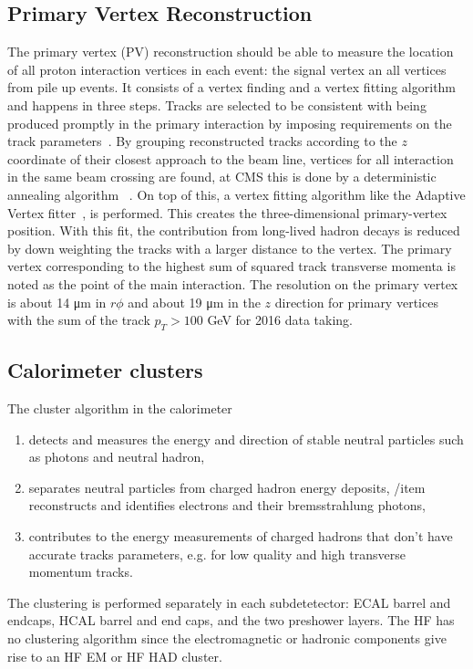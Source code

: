 \subsection{Primary Vertex Reconstruction}
The primary vertex (PV) reconstruction should be able to measure the location of all proton interaction vertices in each event: the signal vertex an all vertices from pile up events. 
It consists of a vertex finding and a vertex fitting algorithm and happens in three steps. Tracks are selected  to be consistent with being produced promptly in the primary interaction by imposing requirements on the track parameters~\cite{Chatrchyan:1704291}. By grouping reconstructed tracks according to the $z$ coordinate of their closest approach to the beam line, vertices for all interaction in the same beam crossing are found, at CMS this is done by a deterministic annealing algorithm~\cite{726788} . On top of this, a vertex fitting algorithm like the Adaptive Vertex fitter~\cite{Waltenberger:1166320}, is performed. This creates the three-dimensional primary-vertex position. With this fit, the contribution from long-lived hadron decays is reduced by down weighting the tracks with a larger distance to the vertex. The primary vertex corresponding to the highest sum of squared track transverse momenta is noted as the point of the main interaction. The resolution on the primary vertex is about 14 \si{ \micro \meter} in $r\phi$ and about 19 \si{ \micro \meter} in the $z$ direction for primary vertices with the sum of the track $p_T > 100$ \si{ \GeV} for 2016 data taking.

\subsection{Calorimeter clusters}
The cluster algorithm in the calorimeter 
\begin{enumerate}
	\item detects and measures the energy and direction of stable neutral particles such as photons and neutral hadron, 
	\item separates neutral particles from charged hadron energy deposits, 
	/item reconstructs and identifies electrons and their bremsstrahlung photons, 
	\item contributes to the energy measurements of charged hadrons that don't have accurate tracks parameters, e.g. for low quality and high transverse momentum tracks. 
\end{enumerate}
The clustering is performed separately in each subdetetector: ECAL barrel and endcaps, HCAL barrel and end caps, and the two preshower layers. The HF has no clustering algorithm since the electromagnetic or hadronic components give rise to an HF EM or HF HAD cluster. 

